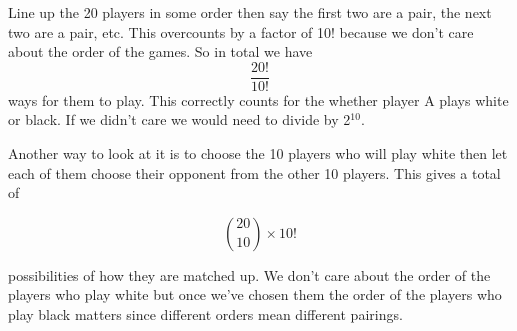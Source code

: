 Line up the 20 players in some order then say the first two are a pair, the
next two are a pair, etc. This overcounts by a factor of 10! because we don't 
care about the order of the games. So in total we have
    $$ \frac{20!}{10!} $$
ways for them to play. This correctly counts for the whether player A plays 
white or black. If we didn't care we would need to divide by 2$^{10}$.

Another way to look at it is to choose the 10 players who will play white then 
let each of them choose their opponent from the other 10 players. This gives a 
total of

$$ {20 \choose 10} \times 10!$$

possibilities of how they are matched up. We don't care about the order of the 
players who play white but once we've chosen them the order of the players who 
play black matters since different orders mean different pairings.